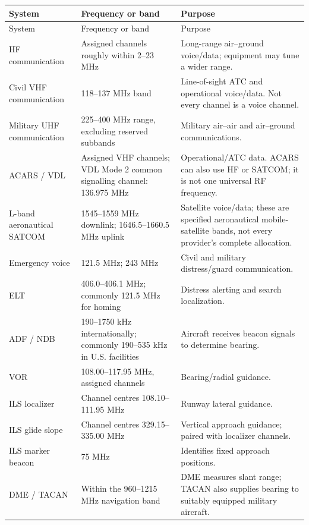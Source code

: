 \documentclass[12pt,a4paper]{article}
\begin{document}
\small
\begin{longtable}{@{}P{3.1cm}P{5.0cm}P{7.2cm}@{}}
\toprule
System & Frequency or band & Purpose \\
\midrule
\endfirsthead
\toprule System & Frequency or band & Purpose \\
\midrule
\endhead
\bottomrule
\endfoot
HF communication & Assigned channels roughly within 2--23 MHz & Long-range air--ground voice/data; equipment may tune a wider range. \\
\addlinespace
Civil VHF communication & 118--137 MHz band & Line-of-sight ATC and operational voice/data. Not every channel is a voice channel. \\
\addlinespace
Military UHF communication & 225--400 MHz range, excluding reserved subbands & Military air--air and air--ground communications. \\
\addlinespace
ACARS / VDL & Assigned VHF channels; VDL Mode 2 common signalling channel: 136.975 MHz & Operational/ATC data. ACARS can also use HF or SATCOM; it is not one universal RF frequency. \\
\addlinespace
L-band aeronautical SATCOM & 1545--1559 MHz downlink; 1646.5--1660.5 MHz uplink & Satellite voice/data; these are specified aeronautical mobile-satellite bands, not every provider's complete allocation. \\
\addlinespace
Emergency voice & 121.5 MHz; 243 MHz & Civil and military distress/guard communication. \\
\addlinespace
ELT & 406.0--406.1 MHz; commonly 121.5 MHz for homing & Distress alerting and search localization. \\
\addlinespace
ADF / NDB & 190--1750 kHz internationally; commonly 190--535 kHz in U.S. facilities & Aircraft receives beacon signals to determine bearing. \\
\addlinespace
VOR & 108.00--117.95 MHz, assigned channels & Bearing/radial guidance. \\
\addlinespace
ILS localizer & Channel centres 108.10--111.95 MHz & Runway lateral guidance. \\
\addlinespace
ILS glide slope & Channel centres 329.15--335.00 MHz & Vertical approach guidance; paired with localizer channels. \\
\addlinespace
ILS marker beacon & 75 MHz & Identifies fixed approach positions. \\
\addlinespace
DME / TACAN & Within the 960--1215 MHz navigation band & DME measures slant range; TACAN also supplies bearing to suitably equipped military aircraft. \\

\end{longtable}
\end{document}
